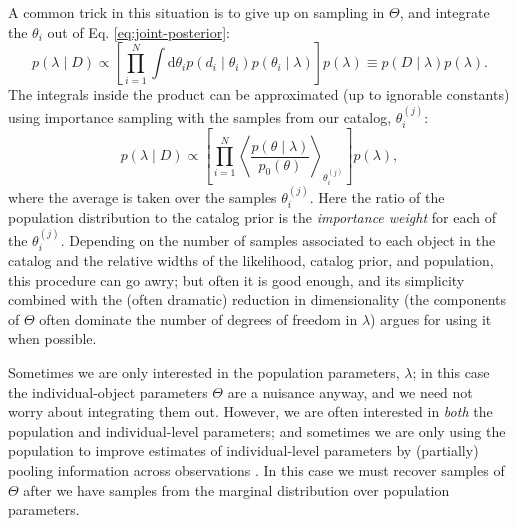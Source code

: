 \documentclass[modern]{aastex63}
\newcommand{\dd}{\ensuremath{\mathrm{d}}}
\begin{document}
A common trick in this situation is to give up on sampling in $\Theta$, and
integrate the $\theta_i$ out of Eq. \eqref{eq:joint-posterior}:
%
\begin{equation}
  p\left( \lambda \mid D \right) \propto \left[ \prod_{i=1}^N \int \dd \theta_i p\left( d_i \mid \theta_i \right) p\left( \theta_i \mid \lambda \right) \right] p\left( \lambda \right) \equiv p\left( D \mid \lambda \right) p\left( \lambda \right).
\end{equation}
%
The integrals inside the product can be approximated (up to ignorable constants)
using importance sampling with the samples from our catalog, $\theta_i^{(j)}$:
%
\begin{equation}
  \label{eq:marginal-population}
  p\left( \lambda \mid D \right) \propto \left[ \prod_{i=1}^N \left\langle \frac{p\left(\theta \mid \lambda \right)}{p_0\left( \theta \right)} \right\rangle_{\theta_i^{(j)}} \right] p\left( \lambda \right),
\end{equation}
%
where the average is taken over the samples $\theta_i^{(j)}$.  Here the ratio of
the population distribution to the catalog prior is the \emph{importance weight}
for each of the $\theta_i^{(j)}$.  Depending on the number of samples associated
to each object in the catalog and the relative widths of the likelihood, catalog
prior, and population, this procedure can go awry; but often it is good enough,
and its simplicity combined with the (often dramatic) reduction in
dimensionality (the components of $\Theta$ often dominate the number of degrees
of freedom in $\lambda$) argues for using it when possible.

Sometimes we are only interested in the population parameters, $\lambda$; in
this case the individual-object parameters $\Theta$ are a nuisance anyway, and
we need not worry about integrating them out.  However, we are often interested
in \emph{both} the population and individual-level parameters; and sometimes we
are only using the population to improve estimates of individual-level
parameters by (partially) pooling information across observations
\citep{Lieu2017}.  In this case we must recover samples of $\Theta$ after we
have samples from the marginal distribution over population parameters.
\end{document}
